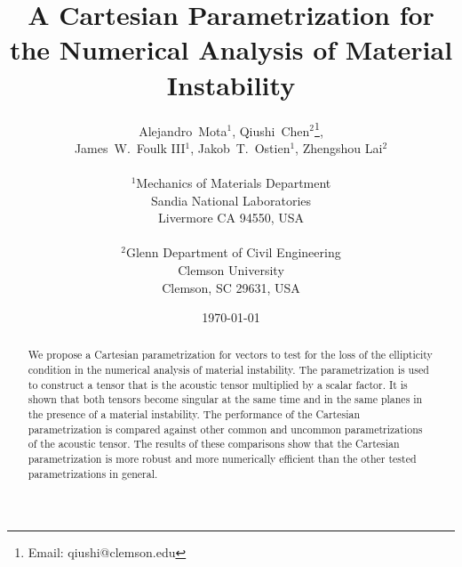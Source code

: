 \documentclass[12pt]{article}
\numberwithin{equation}{section}
\begin{document}





\title{A Cartesian Parametrization for the Numerical Analysis of Material Instability}

\author{
  \Large Alejandro~Mota$^1$,
  Qiushi~Chen$^2$\thanks{Email: qiushi@clemson.edu},
  \\
  \Large James~W.~Foulk {III}$^1$,
  Jakob~T.~Ostien$^1$, Zhengshou Lai$^2$
  \\
  \\
  $^1$Mechanics of Materials Department\\
  Sandia National Laboratories\\
  Livermore CA 94550, USA\\
  \\
  $^2$Glenn Department of Civil Engineering\\
  Clemson University\\
  Clemson, SC 29631, USA\\   
}

\date{\today}

\maketitle

\begin{abstract}
  We propose a Cartesian parametrization for vectors to test for the
  loss of the ellipticity condition in the numerical analysis of
  material instability. The parametrization is used to construct a 
  tensor that is the acoustic tensor multiplied by a scalar factor. It 
  is shown that both tensors become singular at the same time and in 
  the same planes in the presence of a material instability. The 
  performance of the Cartesian parametrization is compared against 
  other common and uncommon parametrizations of the acoustic tensor. 
  The results of these comparisons show that the Cartesian 
  parametrization is more robust and more numerically efficient than 
  the other tested parametrizations in general.  
\end{abstract}
\end{document}
